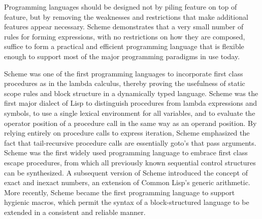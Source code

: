
\label{historysection}

Programming languages should be designed not by piling feature on top of
feature, but by removing the weaknesses and restrictions that make additional
features appear necessary.  Scheme demonstrates that a very small number
of rules for forming expressions, with no restrictions on how they are
composed, suffice to form a practical and efficient programming language
that is flexible enough to support most of the major programming
paradigms in use today.

Scheme
was one of the first programming languages to incorporate first class
procedures as in the lambda calculus, thereby proving the usefulness of
static scope rules and block structure in a dynamically typed language.
Scheme was the first major dialect of Lisp to distinguish procedures
from lambda expressions and symbols, to use a single lexical
environment for all variables, and to evaluate the operator position
of a procedure call in the same way as an operand position.  By relying
entirely on procedure calls to express iteration, Scheme emphasized the
fact that tail-recursive procedure calls are essentially goto's that
pass arguments.  Scheme was the first widely used programming language to
embrace first class escape procedures, from which all previously known
sequential control structures can be synthesized.  A subsequent
version of Scheme introduced the concept of exact and inexact numbers,
an extension of Common Lisp's generic arithmetic.
More recently, Scheme became the first programming language to support
hygienic macros, which permit the syntax of a block-structured language
to be extended in a consistent and reliable manner.

